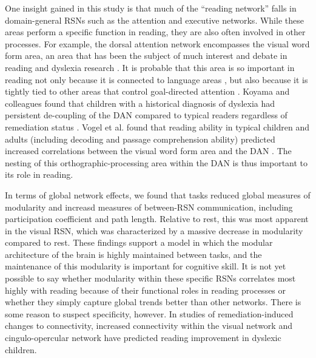 One insight gained in this study is that much of the ``reading network'' falls in domain-general RSNs such as the attention and executive networks. While these areas perform a specific function in reading, they are also often involved in other processes. For example, the dorsal attention network encompasses the visual word form area, an area that has been the subject of much interest and debate in reading and dyslexia research \citep{McCandliss2003}. It is probable that this area is so important in reading not only because it is connected to language areas \citep{Bouhali2014}, but also because it is tightly tied to other areas that control goal-directed attention \citep{Vogel2014}. Koyama and colleagues found that children with a historical diagnosis of dyslexia had persistent de-coupling of the DAN compared to typical readers regardless of remediation status \citep{Koyama2013}. Vogel et al. found that reading ability in typical children and adults (including decoding and passage comprehension ability) predicted increased correlations between the visual word form area and the DAN \citep{Vogel2012a}. The nesting of this orthographic-processing area within the DAN is thus important to its role in reading.

In terms of global network effects, we found that tasks reduced global measures of modularity and increasd measures of between-RSN communication, including participation coefficient and path length. Relative to rest, this was most apparent in the visual RSN, which was characterized by a massive decrease in modularity compared to rest. These findings support a model in which the modular architecture of the brain is highly maintained between tasks, and the maintenance of this modularity is important for cognitive skill. It is not yet possible to say whether modularity within these specific RSNs correlates most highly with reading because of their functional roles in reading processes or whether they simply capture global trends better than other networks. There is some reason to suspect specificity, however. In studies of remediation-induced changes to connectivity, increased connectivity within the visual network \citep{Koyama2013} and cingulo-opercular network \citep{HorowitzKraus2015} have predicted reading improvement in dyslexic children. 

